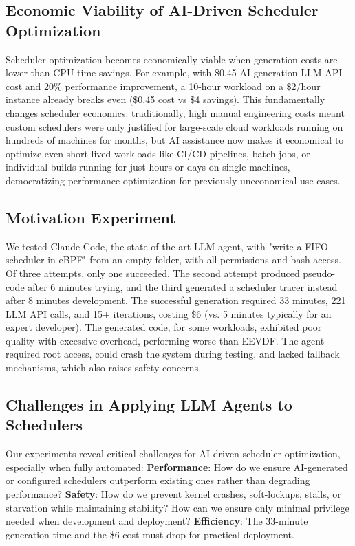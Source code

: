 \documentclass[preprint]{article}
\begin{document}
\subsection{Economic Viability of AI-Driven Scheduler Optimization}

Scheduler optimization becomes economically viable when generation costs are lower than CPU time savings. For example, with \$0.45 AI generation LLM API cost and 20\% performance improvement, a 10-hour workload on a \$2/hour instance already breaks even (\$0.45 cost vs \$4 savings). This fundamentally changes scheduler economics: traditionally, high manual engineering costs meant custom schedulers were only justified for large-scale cloud workloads running on hundreds of machines for months, but AI assistance now makes it economical to optimize even short-lived workloads like CI/CD pipelines, batch jobs, or individual builds running for just hours or days on single machines, democratizing performance optimization for previously uneconomical use cases.

\subsection{Motivation Experiment}

We tested Claude Code\cite{claudecode}, the state of the art LLM agent, with "write a FIFO scheduler in eBPF" from an empty folder, with all permissions and bash access. Of three attempts, only one succeeded. The second attempt produced pseudo-code after 6 minutes trying, and the third generated a scheduler tracer instead after 8 minutes development. The successful generation required 33 minutes, 221 LLM API calls, and 15+ iterations, costing \$6 (vs. 5 minutes typically for an expert developer). The generated code, for some workloads, exhibited poor quality with excessive overhead, performing worse than EEVDF. The agent required root access, could crash the system during testing, and lacked fallback mechanisms, which also raises safety concerns.

\subsection{Challenges in Applying LLM Agents to Schedulers}

Our experiments reveal critical challenges for AI-driven scheduler optimization, especially when fully automated: \textbf{Performance}: How do we ensure AI-generated or configured schedulers outperform existing ones rather than degrading performance? \textbf{Safety}: How do we prevent kernel crashes, soft-lockups, stalls, or starvation while maintaining stability? How can we ensure only minimal privilege needed when development and deployment? \textbf{Efficiency}: The 33-minute generation time and the \$6 cost must drop for practical deployment.
\end{document}
